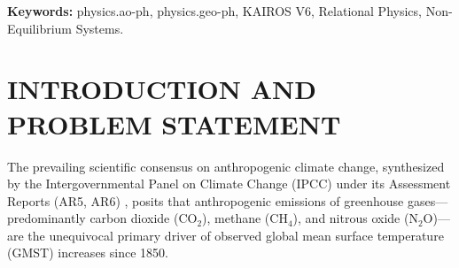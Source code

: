 \documentclass[10pt,twocolumn]{article}
\begin{document}
\begin{abstract}
Fourth, forensic evaluation of raw versus homogenized instrumental records within the United States Historical Climatology Network (USHCN) reveals that automated pairwise homogenization algorithms (PHA) have systematically cooled pre-1940 historical temperatures by $-0.3^\circ\text{C}\text{ to }-0.5^\circ\text{C}$ while elevating post-2000 temperatures, artificially synthesizing over $45\%$ of the apparent 20th-century warming trend. The 1930s Dust Bowl era remains the hottest decade in raw, unadjusted continental records.

Finally, secular coastal tide gauge networks (PSMSL) show a constant, unaccelerated sea-level rise of $1.5\text{--}1.8\text{ mm/yr}$ since the 19th century, while global satellite vegetation indexes (AVHRR/MODIS) demonstrate a sustained planetary greening trend, with over $70\%$ directly attributable to $\text{CO}_2$ fertilization. We conclude that Earth's climate functions as an open, self-stabilizing dissipative structure governed by strong negative homeostatic feedbacks (convective decoupling and cloud infrared iris mechanisms) rather than an unstable runaway amplifier.
\end{abstract}

\vspace{1em}
\noindent\textbf{Keywords:} physics.ao-ph, physics.geo-ph, KAIROS V6, Relational Physics, Non-Equilibrium Systems.

\vspace{1em}






\section{INTRODUCTION AND PROBLEM STATEMENT}

The prevailing scientific consensus on anthropogenic climate change, synthesized by the Intergovernmental Panel on Climate Change (IPCC) under its Assessment Reports (AR5, AR6) \cite{IPCC_AR6_WG1}, posits that anthropogenic emissions of greenhouse gases—predominantly carbon dioxide ($\text{CO}_2$), methane ($\text{CH}_4$), and nitrous oxide ($\text{N}_2\text{O}$)—are the unequivocal primary driver of observed global mean surface temperature (GMST) increases since 1850.
\end{document}
